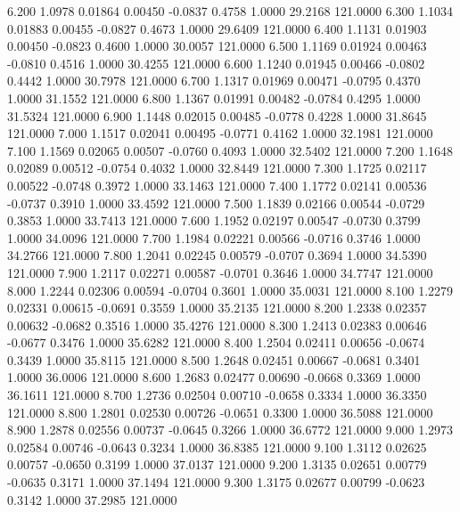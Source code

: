    6.200   1.0978   0.01864   0.00450  -0.0837   0.4758   1.0000  29.2168 121.0000
   6.300   1.1034   0.01883   0.00455  -0.0827   0.4673   1.0000  29.6409 121.0000
   6.400   1.1131   0.01903   0.00450  -0.0823   0.4600   1.0000  30.0057 121.0000
   6.500   1.1169   0.01924   0.00463  -0.0810   0.4516   1.0000  30.4255 121.0000
   6.600   1.1240   0.01945   0.00466  -0.0802   0.4442   1.0000  30.7978 121.0000
   6.700   1.1317   0.01969   0.00471  -0.0795   0.4370   1.0000  31.1552 121.0000
   6.800   1.1367   0.01991   0.00482  -0.0784   0.4295   1.0000  31.5324 121.0000
   6.900   1.1448   0.02015   0.00485  -0.0778   0.4228   1.0000  31.8645 121.0000
   7.000   1.1517   0.02041   0.00495  -0.0771   0.4162   1.0000  32.1981 121.0000
   7.100   1.1569   0.02065   0.00507  -0.0760   0.4093   1.0000  32.5402 121.0000
   7.200   1.1648   0.02089   0.00512  -0.0754   0.4032   1.0000  32.8449 121.0000
   7.300   1.1725   0.02117   0.00522  -0.0748   0.3972   1.0000  33.1463 121.0000
   7.400   1.1772   0.02141   0.00536  -0.0737   0.3910   1.0000  33.4592 121.0000
   7.500   1.1839   0.02166   0.00544  -0.0729   0.3853   1.0000  33.7413 121.0000
   7.600   1.1952   0.02197   0.00547  -0.0730   0.3799   1.0000  34.0096 121.0000
   7.700   1.1984   0.02221   0.00566  -0.0716   0.3746   1.0000  34.2766 121.0000
   7.800   1.2041   0.02245   0.00579  -0.0707   0.3694   1.0000  34.5390 121.0000
   7.900   1.2117   0.02271   0.00587  -0.0701   0.3646   1.0000  34.7747 121.0000
   8.000   1.2244   0.02306   0.00594  -0.0704   0.3601   1.0000  35.0031 121.0000
   8.100   1.2279   0.02331   0.00615  -0.0691   0.3559   1.0000  35.2135 121.0000
   8.200   1.2338   0.02357   0.00632  -0.0682   0.3516   1.0000  35.4276 121.0000
   8.300   1.2413   0.02383   0.00646  -0.0677   0.3476   1.0000  35.6282 121.0000
   8.400   1.2504   0.02411   0.00656  -0.0674   0.3439   1.0000  35.8115 121.0000
   8.500   1.2648   0.02451   0.00667  -0.0681   0.3401   1.0000  36.0006 121.0000
   8.600   1.2683   0.02477   0.00690  -0.0668   0.3369   1.0000  36.1611 121.0000
   8.700   1.2736   0.02504   0.00710  -0.0658   0.3334   1.0000  36.3350 121.0000
   8.800   1.2801   0.02530   0.00726  -0.0651   0.3300   1.0000  36.5088 121.0000
   8.900   1.2878   0.02556   0.00737  -0.0645   0.3266   1.0000  36.6772 121.0000
   9.000   1.2973   0.02584   0.00746  -0.0643   0.3234   1.0000  36.8385 121.0000
   9.100   1.3112   0.02625   0.00757  -0.0650   0.3199   1.0000  37.0137 121.0000
   9.200   1.3135   0.02651   0.00779  -0.0635   0.3171   1.0000  37.1494 121.0000
   9.300   1.3175   0.02677   0.00799  -0.0623   0.3142   1.0000  37.2985 121.0000
